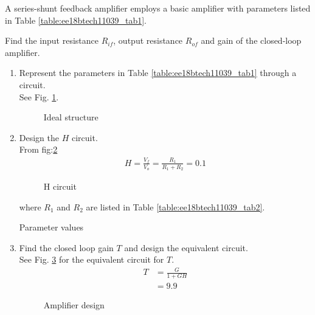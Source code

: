 A series-shunt feedback amplifier employs a basic amplifier with parameters listed in 
Table \ref{table:ee18btech11039_tab1}.
%
\begin{table}[!ht]
\centering

\caption{}
\label{table:ee18btech11039_tab1}
\end{table}
%
Find the input resistance $R_{if}$, output resistance $R_{of}$ and gain 
    of the closed-loop amplifier.  
\begin{enumerate}[label=\arabic*.,ref=\theenumi]

\item Represent the parameters in Table \ref{table:ee18btech11039_tab1} through a circuit.
\\
\solution See Fig. \ref{fig:ee18btech11039_fig1}. 
\begin{figure}[!h]
		\resizebox{\columnwidth}{!}{}
\caption{Ideal structure}
\label{fig:ee18btech11039_fig1}
\end{figure}

 \item  Design the $H$ circuit.\\
\solution 
From fig:\ref{fig:ee18btech11039_fig5}
\begin{align}
H = \frac{V_f}{V_o} = \frac{R_1}{R_1 + R_2} = 0.1
\end{align}
\begin{figure}[!h]
		\resizebox{\columnwidth}{!}{}
\caption{H circuit}
\label{fig:ee18btech11039_fig5}
\end{figure}
%
where $R_1$ and $R_2$ are listed in Table \ref{table:ee18btech11039_tab2}.
%
\begin{table}[!h]
\centering

\caption{Parameter values}
\label{table:ee18btech11039_tab2}
\end{table}
%
\item Find the closed loop gain $T$ and design the equivalent circuit.
\\
\solution See Fig. \ref{fig:ee18btech11039_fig3} for the equivalent circuit for $T$.
\begin{align}
    T &= \frac{G}{1+GH}
\\
      &= 9.9
\end{align}
%
\begin{figure}[!h]
		\resizebox{\columnwidth}{!}{}
\caption{Amplifier design}
\label{fig:ee18btech11039_fig3}
\end{figure}


\end{enumerate}
